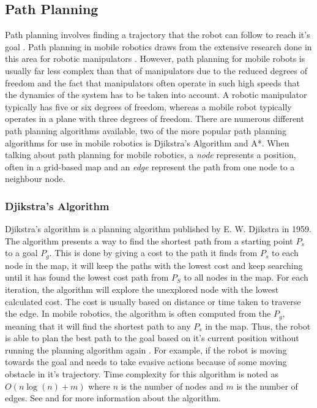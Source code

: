 \subsection{Path Planning}\label{T:AN:PathPlaninng}
Path planning involves finding a trajectory that the robot can follow to reach it's goal \cite{SiegwartRoland2011Itam}. Path planning in mobile robotics draws from the extensive research done in this area for robotic manipulators \cite{SiegwartRoland2011Itam}. However, path planning for mobile robots is usually far less complex than that of manipulators due to the reduced degrees of freedom and the fact that manipulators often operate in such high speeds that the dynamics of the system has to be taken into account\cite{SiegwartRoland2011Itam}. A robotic manipulator typically has five or six degrees of freedom, whereas a mobile robot typically operates in a plane with three degrees of freedom. There are numerous different path planning algorithms available, two of the more popular path planning algorithms for use in mobile robotics is Djikstra's Algorithm and A*. When talking about path planning for mobile robotics, a \textit{node} represents a position, often in a grid-based map and an \textit{edge} represent the path from one node to a neighbour node. 

\subsubsection{Djikstra's Algorithm}\label{T:AN:PP:DjikstrasAlgotihm}
Djikstra's algorithm is a planning algorithm published by E. W. Djikstra in 1959\cite{DijkstraE.W1959Anot}. The algorithm presents a way to find the shortest path from a starting point $P_s$ to a goal $P_g$. This is done by giving a cost to the path it finds from $P_s$ to each node in the map, it will keep the paths with the lowest cost and keep searching until it has found the lowest cost path from $P_S$ to all nodes in the map. For each iteration, the algorithm will explore the unexplored node with the lowest calculated cost. The cost is usually based on distance or time taken to traverse the edge. In mobile robotics, the algorithm is often computed from the $P_g$, meaning that it will find the shortest path to any $P_s$ in the map. Thus, the robot is able to plan the best path to the goal based on it's current position without running the planning algorithm again \cite{SiegwartRoland2011Itam}. For example, if the robot is moving towards the goal and needs to take evasive actions because of some moving obstacle in it's trajectory. Time complexity for this algorithm is noted as $O(n\log(n)+m)$ where $n$ is the number of nodes and $m$ is the number of edges\cite{SiegwartRoland2011Itam}. See \cite{DijkstraE.W1959Anot} and \cite{SiegwartRoland2011Itam} for more information about the algorithm. 


